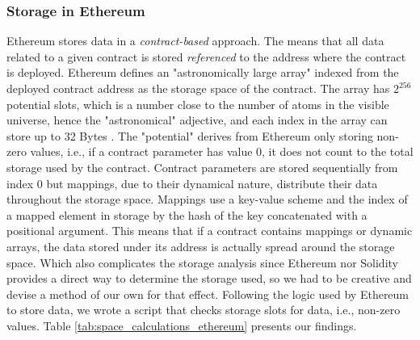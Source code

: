 \documentclass[../NFTComp_IEEE.tex]{subfiles}
\begin{document}
\subsubsection{Storage in Ethereum}
Ethereum stores data in a \textit{contract-based} approach. The means that all data related to a given contract is stored \textit{referenced} to the address where the contract is deployed. Ethereum defines an "astronomically large array" indexed from the deployed contract address as the storage space of the contract. The array has $ 2^{256} $ potential slots, which is a number close to the number of atoms in the visible universe, hence the "astronomical" adjective, and each index in the array can store up to 32 Bytes \cite{Marx2018}. The "potential" derives from Ethereum only storing non-zero values, i.e., if a contract parameter has value 0, it does not count to the total storage used by the contract. Contract parameters are stored sequentially from index 0 but mappings, due to their dynamical nature, distribute their data throughout the storage space. Mappings use a key-value scheme and the index of a mapped element in storage by the hash of the key concatenated with a positional argument. This means that if a contract contains mappings or dynamic arrays, the data stored under its address is actually spread around the storage space. Which also complicates the storage analysis since Ethereum nor Solidity provides a direct way to determine the storage used, so we had to be creative and devise a method of our own for that effect. Following the logic used by Ethereum to store data, we wrote a script that checks storage slots for data, i.e., non-zero values. Table \ref{tab:space_calculations_ethereum} presents our findings.
\end{document}

